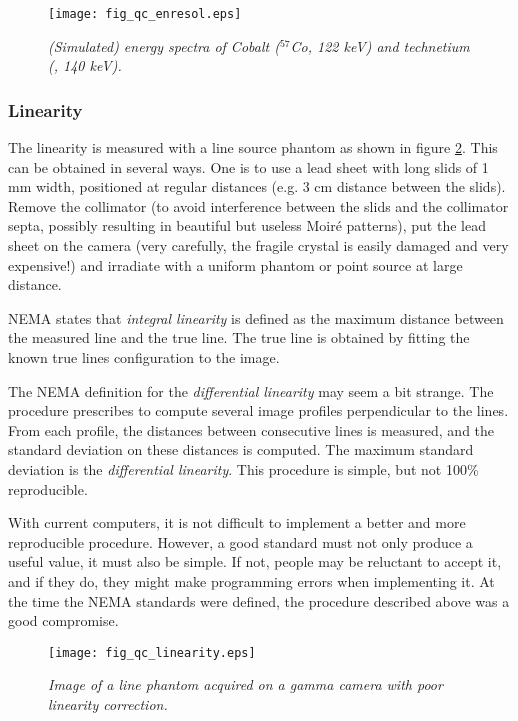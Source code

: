 \begin{figure}[tb]
\centering
\texttt{[image: fig\_qc\_enresol.eps]}
\caption{\label{fig:qc_enresol} \emph{(Simulated) energy spectra of Cobalt
($^{57}$Co, 122 keV) and technetium (\Tc, 140 keV).}}
\end{figure}

\subsubsection{Linearity}
The linearity is measured with a line source phantom as shown in
figure \ref{fig:qc_linearity}. This can be obtained in several
ways. One is to use a lead sheet with long slids of 1 mm width,
positioned at regular distances (e.g. 3 cm distance between the
slids). Remove the collimator (to avoid interference between the slids
and the collimator septa, possibly resulting in beautiful but useless
Moir\'{e} patterns), put the lead sheet on the camera (very carefully,
the fragile crystal is easily damaged and very expensive!) and
irradiate with a uniform phantom or point source at large distance.

NEMA states that {\em integral linearity} is defined as the maximum distance
between the measured line and the true line. The true line is obtained by
fitting the known true lines configuration to the image.

The NEMA definition for the {\em differential linearity} may seem a bit
strange. The procedure prescribes to compute several image profiles
perpendicular to the lines. From each profile, the distances between
consecutive lines is measured, and the standard deviation on these distances is
computed. The maximum standard deviation is the {\em differential linearity}.
This procedure is simple, but not 100\% reproducible.

With current computers, it is not difficult to implement a better and more
reproducible procedure. However, a good standard must not only produce a
useful value, it must also be simple. If not, people may be reluctant to
accept it, and if they do, they might make programming errors when
implementing it. At the time the NEMA standards were defined, the procedure
described above was a good compromise.

\begin{figure}[tb]
\centering
\texttt{[image: fig\_qc\_linearity.eps]}
\caption{\label{fig:qc_linearity} \emph{Image of a line phantom acquired on a
gamma camera with poor linearity correction.}}
\end{figure}

